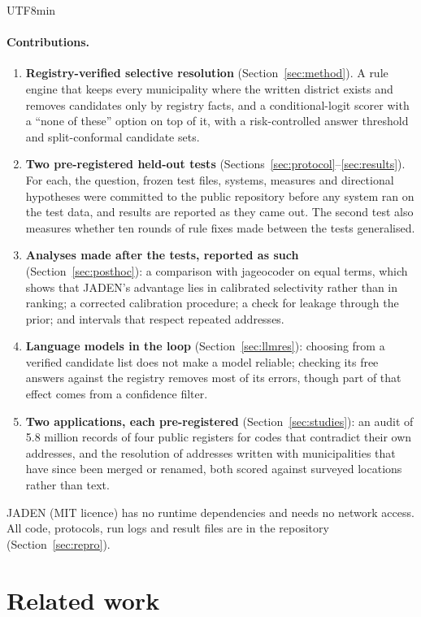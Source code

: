 \documentclass[10pt]{article}
\begin{document}
\begin{CJK}{UTF8}{min}
\paragraph{Contributions.}
\begin{enumerate}
\item \textbf{Registry-verified selective resolution} (Section~\ref{sec:method}). A rule engine that keeps
every municipality where the written district exists and removes candidates only by registry facts,
and a conditional-logit scorer with a ``none of these'' option on top of it, with a risk-controlled
answer threshold and split-conformal candidate sets.
\item \textbf{Two pre-registered held-out tests} (Sections~\ref{sec:protocol}--\ref{sec:results}). For each,
the question, frozen test files, systems, measures and directional hypotheses were committed to the
public repository before any system ran on the test data, and results are reported as they came out.
The second test also measures whether ten rounds of rule fixes made between the tests generalised.
\item \textbf{Analyses made after the tests, reported as such} (Section~\ref{sec:posthoc}): a comparison
with jageocoder on equal terms, which shows that JADEN's advantage lies in calibrated selectivity rather
than in ranking; a corrected calibration procedure; a check for leakage through the prior; and intervals
that respect repeated addresses.
\item \textbf{Language models in the loop} (Section~\ref{sec:llmres}): choosing from a verified candidate
list does not make a model reliable; checking its free answers against the registry removes most of its
errors, though part of that effect comes from a confidence filter.
\item \textbf{Two applications, each pre-registered} (Section~\ref{sec:studies}): an audit of 5.8 million
records of four public registers for codes that contradict their own addresses, and the resolution of
addresses written with municipalities that have since been merged or renamed, both scored against
surveyed locations rather than text.
\end{enumerate}
JADEN (MIT licence) has no runtime dependencies and needs no network access. All code, protocols, run
logs and result files are in the repository (Section~\ref{sec:repro}).

\section{Related work}


\end{CJK}
\end{document}
